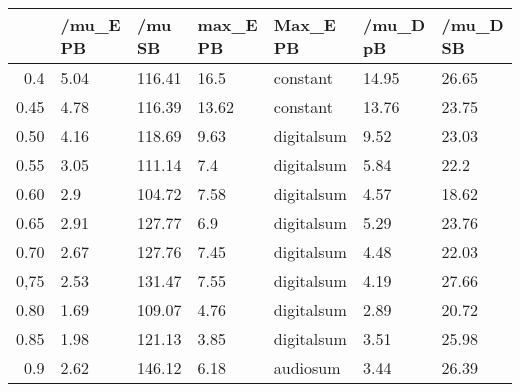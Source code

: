 \begin{table}[ht]
\centering
\begin{tabular}{rllllll}
  \hline
 & /mu\_E PB & /mu SB & max\_E PB & Max\_E PB & /mu\_D pB & /mu\_D SB \\ 
  \hline
0.4 & 5.04 & 116.41 & 16.5 & constant & 14.95 & 26.65 \\ 
  0.45 & 4.78 & 116.39 & 13.62 & constant & 13.76 & 23.75 \\ 
  0.50 & 4.16 & 118.69 & 9.63 & digitalsum & 9.52 & 23.03 \\ 
  0.55 & 3.05 & 111.14 & 7.4 & digitalsum & 5.84 & 22.2 \\ 
  0.60 & 2.9 & 104.72 & 7.58 & digitalsum & 4.57 & 18.62 \\ 
  0.65 & 2.91 & 127.77 & 6.9 & digitalsum & 5.29 & 23.76 \\ 
  0.70 & 2.67 & 127.76 & 7.45 & digitalsum & 4.48 & 22.03 \\ 
  0,75 & 2.53 & 131.47 & 7.55 & digitalsum & 4.19 & 27.66 \\ 
  0.80 & 1.69 & 109.07 & 4.76 & digitalsum & 2.89 & 20.72 \\ 
  0.85 & 1.98 & 121.13 & 3.85 & digitalsum & 3.51 & 25.98 \\ 
  0.9 & 2.62 & 146.12 & 6.18 & audiosum & 3.44 & 26.39 \\ 
   \hline
\end{tabular}
\end{table}
